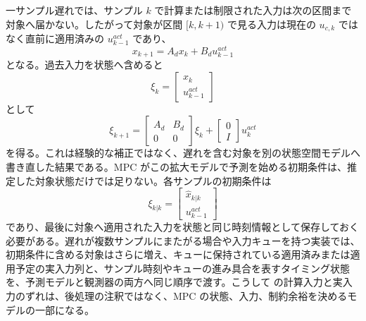 一サンプル遅れでは、サンプル $k$ で計算または制限された入力は次の区間まで対象へ届かない。したがって対象が区間 $[k,k+1)$ で見る入力は現在の $u_{c,k}$ ではなく直前に適用済みの $u_{k-1}^{act}$ であり、
\begin{equation}
  x_{k+1}=A_dx_k+B_du_{k-1}^{act}
\end{equation}
となる。過去入力を状態へ含めると
\begin{equation}
  \xi_k=\begin{bmatrix}x_k\\u_{k-1}^{act}\end{bmatrix}
\end{equation}
として
\begin{equation}
 \xi_{k+1}=\begin{bmatrix}A_d&B_d\\0&0\end{bmatrix}\xi_k+
  \begin{bmatrix}0\\I\end{bmatrix}u_k^{act}
\end{equation}
を得る。これは経験的な補正ではなく、遅れを含む対象を別の状態空間モデルへ書き直した結果である。MPC がこの拡大モデルで予測を始める初期条件は、推定した対象状態だけでは足りない。各サンプルの初期条件は
\begin{equation}
  \xi_{k|k}=
  \begin{bmatrix}
    \hat{x}_{k|k}\\
    u_{k-1}^{act}
  \end{bmatrix}
\end{equation}
であり、最後に対象へ適用された入力を状態と同じ時刻情報として保存しておく必要がある。遅れが複数サンプルにまたがる場合や入力キューを持つ実装では、初期条件に含める対象はさらに増え、キューに保持されている適用済みまたは適用予定の実入力列と、サンプル時刻やキューの進み具合を表すタイミング状態を、予測モデルと観測器の両方へ同じ順序で渡す。こうして  の計算入力と実入力のずれは、後処理の注釈ではなく、MPC の状態、入力、制約余裕を決めるモデルの一部になる。
